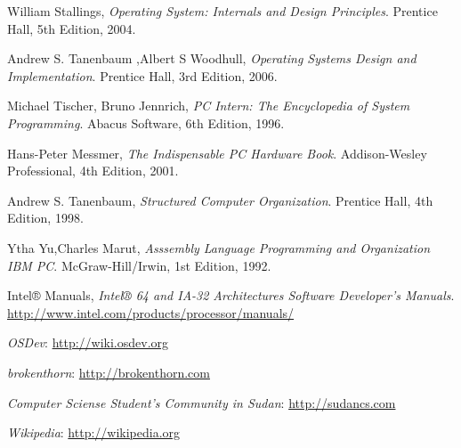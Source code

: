 \documentclass[document.tex]{subfiles}
\begin{document}


\begin{english}
\begin{thebibliography}{10}
 
  William Stallings,
  \emph{Operating System: Internals and Design Principles}.
  Prentice Hall,
  5th Edition,
  2004.
 
  Andrew S. Tanenbaum ,Albert S Woodhull,
  \emph{Operating Systems Design and Implementation}.
  Prentice Hall,
  3rd Edition,
   2006.

  Michael Tischer, Bruno Jennrich,
  \emph{PC Intern: The Encyclopedia of System Programming}.
  Abacus Software,
  6th Edition,
  1996.

  Hans-Peter Messmer,
  \emph{The Indispensable PC Hardware Book}.
  Addison-Wesley Professional,
  4th Edition,
  2001.

  Andrew S. Tanenbaum,
  \emph{Structured Computer Organization}.
  Prentice Hall,
  4th Edition,
  1998.

  Ytha Yu,Charles Marut,
  \emph{Asssembly Language Programming and Organization IBM PC}.
  McGraw-Hill/Irwin,
  1st Edition,
  1992.

  Intel® Manuals,
  \emph{Intel® 64 and IA-32 Architectures Software Developer's Manuals}.
  \url{http://www.intel.com/products/processor/manuals/}


   \emph{OSDev}:
   \url{http://wiki.osdev.org}

  \emph{brokenthorn}:
  \url{http://brokenthorn.com}

  \emph{Computer Sciense Student's Community in Sudan}:
  \url{http://sudancs.com}

  \emph{Wikipedia}:
  \url{http://wikipedia.org}

\end{thebibliography}
\end{english}
\end{document}
